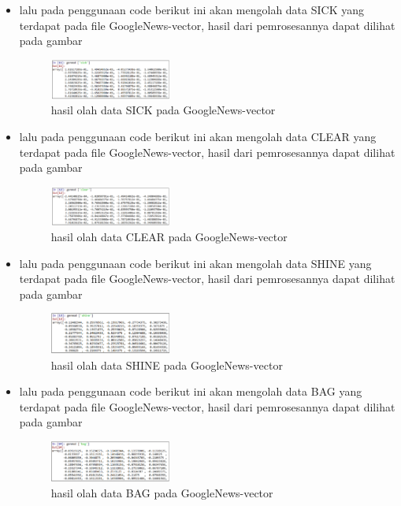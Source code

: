 \begin{enumerate}
\begin{itemize}
\item lalu pada penggunaan code berikut ini akan mengolah data SICK yang terdapat pada file GoogleNews-vector, hasil dari pemrosesannya dapat dilihat pada gambar
\begin{figure}[H]
\includegraphics[width=4cm]{figures/1174002/chapter5/p5.png}
\centering
\caption{hasil olah data SICK pada GoogleNews-vector}
\end{figure}

\item lalu pada penggunaan code berikut ini akan mengolah data CLEAR yang terdapat pada file GoogleNews-vector, hasil dari pemrosesannya dapat dilihat pada gambar
\begin{figure}[H]
\includegraphics[width=4cm]{figures/1174002/chapter5/p6.png}
\centering
\caption{hasil olah data CLEAR pada GoogleNews-vector}
\end{figure}
\item lalu pada penggunaan code berikut ini akan mengolah data SHINE yang terdapat pada file GoogleNews-vector, hasil dari pemrosesannya dapat dilihat pada gambar
\begin{figure}[H]
\includegraphics[width=4cm]{figures/1174002/chapter5/7.png}
\centering
\caption{hasil olah data SHINE pada GoogleNews-vector}
\end{figure}

\item lalu pada penggunaan code berikut ini akan mengolah data BAG yang terdapat pada file GoogleNews-vector, hasil dari pemrosesannya dapat dilihat pada gambar
\begin{figure}[H]
\includegraphics[width=4cm]{figures/1174002/chapter5/8.png}
\centering
\caption{hasil olah data BAG pada GoogleNews-vector}
\end{figure}


\end{itemize}
\end{enumerate}
